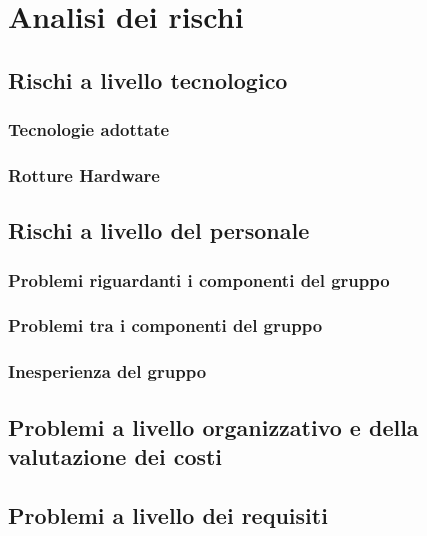 \section{Analisi dei rischi}
\subsection{Rischi a livello tecnologico}
\subsubsection{Tecnologie adottate}
\subsubsection{Rotture Hardware}
\subsection{Rischi a livello del personale}
\subsubsection{Problemi riguardanti i componenti del gruppo}
\subsubsection{Problemi tra i componenti del gruppo}
\subsubsection{Inesperienza del gruppo}
\subsection{Problemi a livello organizzativo e della valutazione dei costi}
\subsection{Problemi a livello dei requisiti}